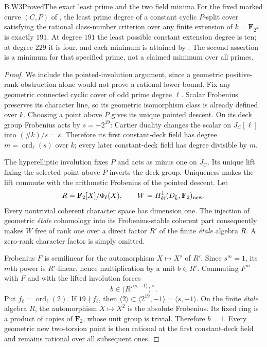 \begin{claim}{B.W3}{Proved}{The exact least prime and the two field minima}
For the fixed marked curve $(C,P)$ of , the
least prime degree of a constant cyclic $P$-split cover satisfying
the rational class-number criterion over any finite extension
of $k=\mathbf F_{2^{38}}$ is exactly $191$.
At degree $191$ the least possible constant extension degree is ten;
at degree $229$ it is four, and each minimum is attained by
. The second assertion is a minimum for that
specified prime, not a claimed minimum over all primes.
\end{claim}
\begin{proof}
We include the pointed-involution argument, since a geometric
positive-rank obstruction alone would not prove a rational
lower bound. Fix any geometric connected cyclic cover of odd
prime degree $\ell$. Scalar Frobenius preserves its character
line, so its geometric isomorphism class is already defined
over $k$. Choosing a point above $P$ gives its unique pointed
descent. On its deck group Frobenius acts by $s=-2^{19}$:
Cartier duality changes the scalar on $J_C[\ell]$ into
$(\#k)/s=s$. Therefore its first constant-deck field has degree
$m=\operatorname{ord}_\ell(s)$ over $k$; every later
constant-deck field has degree divisible by $m$.

The hyperelliptic involution fixes $P$ and acts as minus one
on $J_C$. Its unique lift fixing the selected point above $P$
inverts the deck group. Uniqueness makes the lift commute with
the arithmetic Frobenius of the pointed descent. Let
\[
 R=\mathbf F_2[X]/\Phi_\ell(X),\qquad
 W=H^1_{\et}(D_{\bar k},\mathbf F_2)_{\rm new}.
\]
Every nontrivial coherent character space has dimension one.
The injection of geometric \emph{\'etale} cohomology into its
Frobenius-stable coherent part consequently makes $W$ free
of rank one over a direct factor $R'$ of the finite \emph{\'etale}
algebra $R$. A zero-rank character factor is simply omitted.

Frobenius $F$ is semilinear for the automorphism $X\mapsto X^s$
of $R'$. Since $s^m=1$, its $m$th power is $R'$-linear, hence
multiplication by a unit $b\in R'$. Commuting $F^m$ with $F$
and with the lifted involution forces
\[
 b\in\bigl(R'^{\langle s,-1\rangle}\bigr)^\times.
\]
Put $f_\ell=\operatorname{ord}_\ell(2)$. If $19\nmid f_\ell$,
then $\langle2\rangle\subset\langle2^{19},-1\rangle
=\langle s,-1\rangle$. On the finite \emph{\'etale} algebra $R$,
the automorphism $X\mapsto X^2$ is the absolute Frobenius.
Its fixed ring is a product of copies of $\mathbf F_2$, whose
unit group is trivial. Therefore $b=1$. Every geometric new
two-torsion point is then rational at the first constant-deck
field and remains rational over all subsequent ones.


\end{proof}
